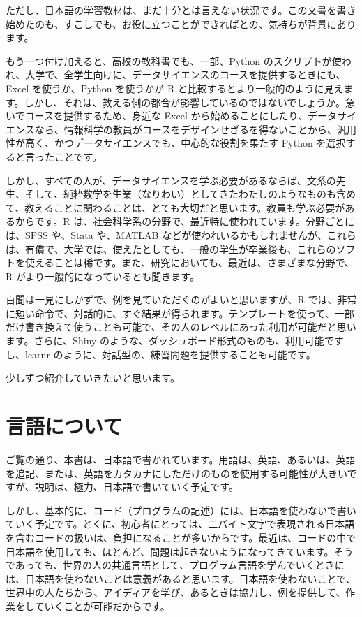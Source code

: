 \documentclass[
  xelatex, ja=standard]{bxjsbook}
\theoremstyle{definition}
\theoremstyle{definition}
\theoremstyle{definition}
\theoremstyle{definition}
\theoremstyle{remark}
\begin{document}
ただし、日本語の学習教材は、まだ十分とは言えない状況です。この文書を書き始めたのも、すこしでも、お役に立つことができればとの、気持ちが背景にあります。

もう一つ付け加えると、高校の教科書でも、一部、Python のスクリプトが使われ、大学で、全学生向けに、データサイエンスのコースを提供するときにも、Excel を使うか、Python を使うかが R と比較するとより一般的のように見えます。しかし、それは、教える側の都合が影響しているのではないでしょうか。急いでコースを提供するため、身近な Excel から始めることにしたり、データサイエンスなら、情報科学の教員がコースをデザインせざるを得ないことから、汎用性が高く、かつデータサイエンスでも、中心的な役割を果たす Python を選択すると言ったことです。

しかし、すべての人が、データサイエンスを学ぶ必要があるならば、文系の先生、そして、純粋数学を生業（なりわい）としてきたわたしのようなものも含めて、教えることに関わることは、とても大切だと思います。教員も学ぶ必要があるからです。R は、社会科学系の分野で、最近特に使われています。分野ごとには、SPSS や、Stata や、MATLAB などが使われいるかもしれませんが、これらは、有償で、大学では、使えたとしても、一般の学生が卒業後も、これらのソフトを使えることは稀です。また、研究においても、最近は、さまざまな分野で、R がより一般的になっているとも聞きます。

百聞は一見にしかずで、例を見ていただくのがよいと思いますが、R では、非常に短い命令で、対話的に、すぐ結果が得られます。テンプレートを使って、一部だけ書き換えて使うことも可能で、その人のレベルにあった利用が可能だと思います。さらに、Shiny のような、ダッシュボード形式のものも、利用可能ですし、learnr のように、対話型の、練習問題を提供することも可能です。

少しずつ紹介していきたいと思います。

\hypertarget{ux8a00ux8a9eux306bux3064ux3044ux3066}{%
\section*{言語について}\label{ux8a00ux8a9eux306bux3064ux3044ux3066}}

ご覧の通り、本書は、日本語で書かれています。用語は、英語、あるいは、英語を追記、または、英語をカタカナにしただけのものを使用する可能性が大きいですが、説明は、極力、日本語で書いていく予定です。

しかし、基本的に、コード（プログラムの記述）には、日本語を使わないで書いていく予定です。とくに、初心者にとっては、二バイト文字で表現される日本語を含むコードの扱いは、負担になることが多いからです。最近は、コードの中で日本語を使用しても、ほとんど、問題は起きないようになってきています。そうであっても、世界の人の共通言語として、プログラム言語を学んでいくときには、日本語を使わないことは意義があると思います。日本語を使わないことで、世界中の人たちから、アイディアを学び、あるときは協力し、例を提供して、作業をしていくことが可能だからです。
\end{document}
